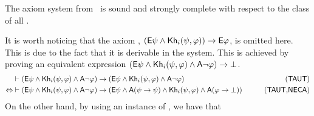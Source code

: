\medskip

\begin{theorem}\label{th:khi-completeness}
The axiom system from~ is sound and strongly complete with respect to the class of all \ultss.
\end{theorem}

\medskip

It is worth noticing that the axiom , $\left({\sf E}\psi \land {\sf Kh}_i(\psi,\varphi)\right) \rightarrow {\sf E}\varphi$, is omitted here. This is due to the fact that it is derivable in the system.
This is achieved by proving an equivalent expression $({\sf E}\psi \wedge {\sf Kh}_i(\psi,\varphi) \wedge {\sf A}\neg\varphi) \rightarrow \bot$. 
%
%
%
%
%
\begin{align*}
    & \vdash (\E\psi \wedge \khi(\psi,\varphi) \wedge \A\neg\varphi) \ra (\E\psi \wedge \khi(\psi,\varphi) \wedge \A\neg\varphi)    & \tag{\axm{TAUT}} \\ 
    \Leftrightarrow & \vdash (\E\psi \wedge \khi(\psi,\varphi) \wedge \A\neg\varphi) \ra (\E\psi \wedge \A(\psi \ra \psi) \wedge \khi(\psi,\varphi) \wedge \A(\varphi \ra \bot)) & \tag{\axm{TAUT},\axm{NECA}}
\end{align*}
%
%
%
On the other hand, by using an instance of , we have that
